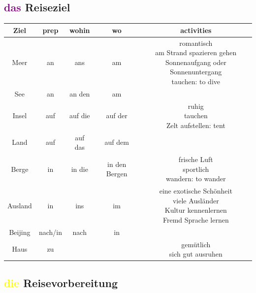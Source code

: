 \subsection{\textcolor{purple}{das} Reiseziel}
\begin{center}
    \begin{tabular}{|c|c|c|c|c|}
        \hline
        \rowcolor{gray}
        Ziel    & prep    & wohin   & wo            & activities                         \\
        \hline
        Meer    & an      & ans     & am            & \makecell{romantisch               \\ am Strand spazieren gehen \\ Sonnenaufgang oder Sonnenuntergang \\ tauchen: to dive} \\
        \hline
        See     & an      & an den  & am            &                                    \\
        \hline
        Insel   & auf     & auf die & auf der       & \makecell{ruhig                    \\ tauchen \\ Zelt aufstellen: tent } \\
        \hline
        Land    & auf     & auf das & auf dem       &                                    \\
        \hline
        Berge   & in      & in die  & in den Bergen & \makecell{frische Luft             \\ sportlich \\ wandern: to wander} \\
        \hline
        Ausland & in      & ins     & im            & \makecell{eine exotische Schönheit \\ viele Ausländer \\ Kultur kennenlernen \\ Fremd Sprache lernen} \\
        \hline
        Beijing & nach/in & nach    & in            &                                    \\
        \hline
        Haus    & zu      &         &               & \makecell{gemütlich                \\ sich gut ausruhen} \\
        \hline
    \end{tabular}
\end{center}

\subsection{\textcolor{yellow}{die} Reisevorbereitung}

